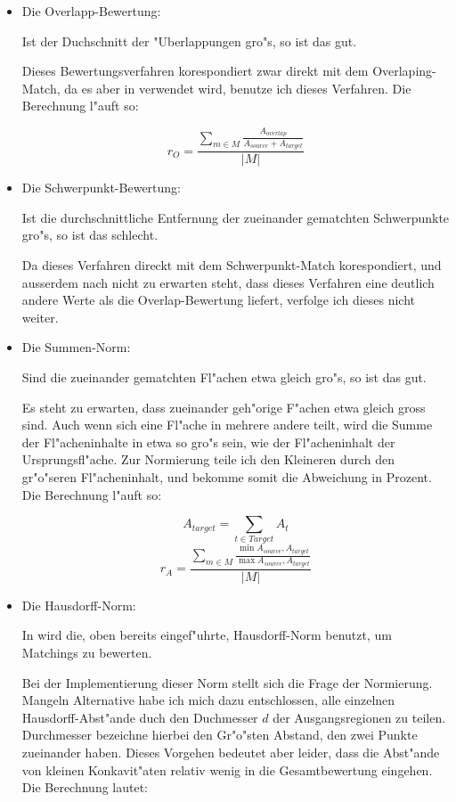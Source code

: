 \documentclass[a4paper,10pt,twoside]{scrreprt}
\begin{document}
\begin{itemize}
\item Die Overlapp-Bewertung: 

Ist der Duchschnitt der "Uberlappungen gro"s, so ist das gut.

Dieses Bewertungsverfahren korespondiert zwar direkt mit dem Overlaping-Match, da es aber in \cite{AFRW} verwendet wird, benutze ich dieses Verfahren. Die Berechnung l"auft so:

$$r_O=\frac{\sum_{m\in M} \frac{A_{overlap}}{A_{source}+A_{target}}}{|M|}$$

\item Die Schwerpunkt-Bewertung:

Ist die durchschnittliche Entfernung der zueinander gematchten Schwerpunkte gro"s, so ist das schlecht.

Da dieses Verfahren direckt mit dem Schwerpunkt-Match korespondiert, und ausserdem nach \cite{AFRW} nicht zu erwarten steht, dass dieses Verfahren eine deutlich andere Werte als die Overlap-Bewertung liefert, verfolge ich dieses nicht weiter.

\item Die Summen-Norm:

Sind die zueinander gematchten Fl"achen etwa gleich gro"s, so ist das gut. 

Es steht zu erwarten, dass zueinander geh"orige F"achen etwa gleich gross sind. Auch wenn sich eine Fl"ache in mehrere andere teilt, wird die Summe der Fl"acheninhalte in etwa so gro"s sein, wie der Fl"acheninhalt der Ursprungsfl"ache. Zur Normierung teile ich den Kleineren durch den gr"o"seren Fl"acheninhalt, und bekomme somit die Abweichung in Prozent. Die Berechnung l"auft so:

$$A_{target}=\sum_{t\in Target}A_t$$
$$r_A=\frac {\sum_{m\in M}\frac{\min{A_{source},A_{target}}}{\max{A_{source},A_{target}}}}{|M|}$$

\item Die Hausdorff-Norm:

In \cite{AAR} wird die,  oben bereits eingef"uhrte, Hausdorff-Norm benutzt, um Matchings zu bewerten. 

Bei der Implementierung dieser Norm stellt sich die Frage der Normierung. Mangeln Alternative habe ich mich dazu entschlossen, alle einzelnen Hausdorff-Abst"ande duch den Duchmesser $d$ der Ausgangsregionen zu teilen.  Durchmesser bezeichne hierbei den Gr"o"sten Abstand, den zwei Punkte zueinander haben. Dieses Vorgehen bedeutet aber leider, dass die Abst"ande von kleinen Konkavit"aten relativ wenig in die Gesamtbewertung eingehen. Die Berechnung lautet:


\end{itemize}
\end{document}
